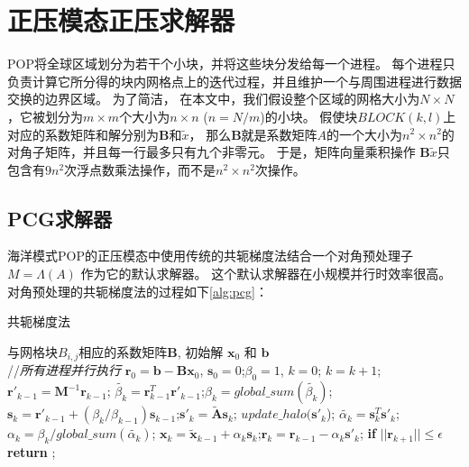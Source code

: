 \section{正压模态正压求解器}
\label{solver:bottleneck}

POP将全球区域划分为若干个小块，并将这些块分发给每一个进程。
每个进程只负责计算它所分得的块内网格点上的迭代过程，并且维护一个与周围进程进行数据交换的边界区域。 
为了简洁， 在本文中，我们假设整个区域的网格大小为$N\times N$，它被划分为$m\times m$个大小为$n\times n$ ($n=N/m$)的小块。 
假使块$BLOCK(k,l)$上对应的系数矩阵和解分别为$\textbf{B}$和$\tilde{x}$， 那么$\textbf{B}$就是系数矩阵$A$的一个大小为$n^2\times n^2$的对角子矩阵，并且每一行最多只有九个非零元\cite{hu2013scalable}。 
于是，矩阵向量乘积操作 $\textbf{B}\tilde{x}$只包含有$9n^2$次浮点数乘法操作，而不是$n^2\times n^2$次操作。 
 
\subsection{PCG求解器} 
\label{solver:pcg}
 
海洋模式POP的正压模态中使用传统的共轭梯度法结合一个对角预处理子$M = \Lambda(A)$ 作为它的默认求解器。 
这个默认求解器在小规模并行时效率很高。 
对角预处理的共轭梯度法的过程如下\ref{alg:pcg}： 

\begin{algorithm}[h]
\caption{共轭梯度法}
\label{alg:pcg}
\begin{algorithmic}[1]
\REQUIRE  与网格块$B_{i,j}$相应的系数矩阵$\textbf{B}$,  初始解 $\textbf{x}_0$ 和 $\textbf{b}$  \\
//\qquad    \textit{所有进程并行执行}
\STATE $\textbf{r}_0 = \textbf{b}-\textbf{B}\textbf{x}_0$, $\textbf{s}_0 =0$;\quad $\beta_0=1$, $k=0$;
\STATE $k=k+1$;\quad $\textbf{r}'_{k-1} =\textbf{M}^{-1}\textbf{r}_{k-1}$;\quad {}
\STATE $\tilde{\beta_k} = \textbf{r}_{k-1}^T\textbf{r}'_{k-1}$;\quad $\beta_k = global\_sum(\tilde{\beta_k})$; 
\STATE $\textbf{s}_k = \textbf{r}'_{k-1} +(\beta_k/\beta_{k-1})\textbf{s}_{k-1}$;\quad $\textbf{s}'_k = \tilde{\textbf{A}}\textbf{s}_k$; 
\STATE $update\_halo(\textbf{s}'_k$); 
\STATE $\tilde{\alpha_k} = \textbf{s}_k^T\textbf{s}'_k$;\quad $\alpha_k =\beta_k/ global\_sum(\tilde{\alpha_k})$;\quad {}
\STATE $\textbf{x}_k =\tilde{\textbf{x}}_{k-1} +\alpha_k \textbf{s}_k$;\quad $\textbf{r}_k =\textbf{r}_{k-1} -\alpha_k\textbf{s}'_k$;
\STATE \textbf{if} $||\textbf{r}_{k+1}|| \le \epsilon$  \textbf{return} ;
\ENDIF
\ENDWHILE
\end{algorithmic}
\end{algorithm}

